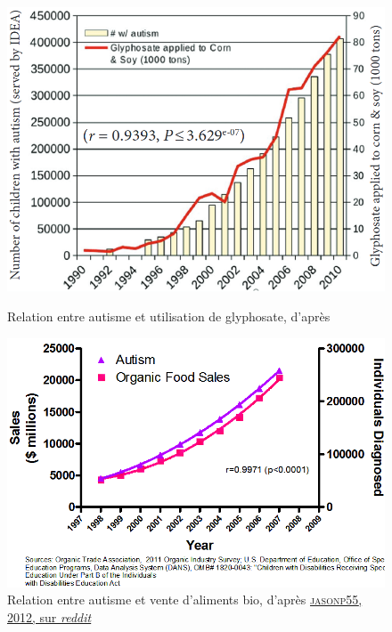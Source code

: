 \begin{figure}[H]
	\begin{minipage}[b]{.46\linewidth}
		\centering
		\includegraphics[width=\linewidth]{img/autisme_glyphosate.png}
		\caption{Relation entre autisme et utilisation de glyphosate, d'après \cite[Figure 2, p. 51]{shaw_elevated_2017} \label{fig:autisme-glyphosate}}
	\end{minipage} \hfill
	\begin{minipage}[b]{.46\linewidth}
		\centering
		\includegraphics[width=\linewidth]{img/autisme_bio.png}
		\caption{Relation entre autisme et vente d'aliments \og bio\fg{}, d'après \href{https://www.reddit.com/r/skeptic/comments/14qbn9/rskeptic_i_was_practicing_graphpad_and_i_think_i/}{\textsc{jasonp55}, 2012, sur \textit{reddit}} \label{fig:autisme-bio}}
	\end{minipage}
\end{figure}


